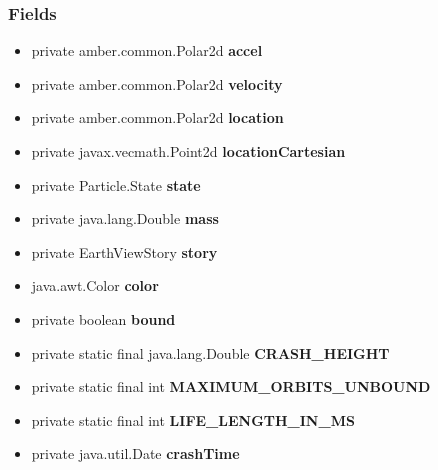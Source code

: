 {{\subsubsection{Fields}{
\begin{itemize}
\item{
\label{amber.showoff.Particle.accel}private amber.common.Polar2d {\bf accel}}
\item{
\label{amber.showoff.Particle.velocity}private amber.common.Polar2d {\bf velocity}}
\item{
\label{amber.showoff.Particle.location}private amber.common.Polar2d {\bf location}}
\item{
\label{amber.showoff.Particle.locationCartesian}private javax.vecmath.Point2d {\bf locationCartesian}}
\item{
\label{amber.showoff.Particle.state}private Particle.State {\bf state}}
\item{
\label{amber.showoff.Particle.mass}private java.lang.Double {\bf mass}}
\item{
\label{amber.showoff.Particle.story}private EarthViewStory {\bf story}}
\item{
\label{amber.showoff.Particle.color} java.awt.Color {\bf color}}
\item{
\label{amber.showoff.Particle.bound}private boolean {\bf bound}}
\item{
\label{amber.showoff.Particle.CRASH_HEIGHT}private static final java.lang.Double {\bf CRASH\_HEIGHT}}
\item{
\label{amber.showoff.Particle.MAXIMUM_ORBITS_UNBOUND}private static final int {\bf MAXIMUM\_ORBITS\_UNBOUND}}
\item{
\label{amber.showoff.Particle.LIFE_LENGTH_IN_MS}private static final int {\bf LIFE\_LENGTH\_IN\_MS}
}
\item{
\label{amber.showoff.Particle.crashTime}private java.util.Date {\bf crashTime}}
\end{itemize}
}
}}
